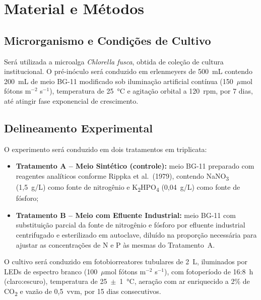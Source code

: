 
\section{Material e Métodos}

\subsection{Microrganismo e Condições de Cultivo}

Será utilizada a microalga \textit{Chlorella fusca}, obtida de coleção de
cultura institucional. O pré-inóculo será conduzido em erlenmeyers de 500~mL
contendo 200~mL de meio BG-11 modificado sob iluminação artificial contínua
(150~$\mu$mol fótons m$^{-2}$ s$^{-1}$), temperatura de 25~°C e agitação
orbital a 120~rpm, por 7 dias, até atingir fase exponencial de crescimento.

\subsection{Delineamento Experimental}

O experimento será conduzido em dois tratamentos em triplicata:

\begin{itemize}
    \item \textbf{Tratamento A -- Meio Sintético (controle):} meio BG-11
          preparado com reagentes analíticos conforme Rippka et al.\ (1979),
          contendo NaNO\textsubscript{3} (1,5~g/L) como fonte de nitrogênio
          e K\textsubscript{2}HPO\textsubscript{4} (0,04~g/L) como fonte
          de fósforo;

    \item \textbf{Tratamento B -- Meio com Efluente Industrial:} meio BG-11
          com substituição parcial da fonte de nitrogênio e fósforo por
          efluente industrial centrifugado e esterilizado em autoclave,
          diluído na proporção necessária para ajustar as concentrações de
          N e P às mesmas do Tratamento~A.
\end{itemize}

O cultivo será conduzido em fotobiorreatores tubulares de 2~L,
iluminados por LEDs de espectro branco (100~$\mu$mol fótons m$^{-2}$ s$^{-1}$),
com fotoperíodo de 16:8~h (claro:escuro), temperatura de 25~$\pm$~1~°C,
aeração com ar enriquecido a 2\% de CO\textsubscript{2} e vazão de
0,5~vvm, por 15 dias consecutivos.

